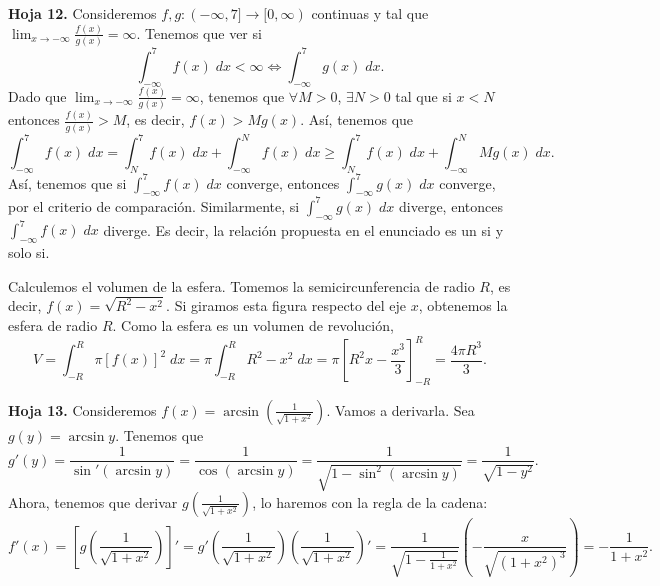 \begin{eg}
	\normalfont \textbf{Hoja 12.} Consideremos $\displaystyle f,g : (-\infty,7] \to [0,\infty) $ continuas y tal que $\displaystyle \lim_{x \to -\infty}\frac{f\left(x\right)}{g\left(x\right)} =\infty  $. Tenemos que ver si 
	\[ \int^{7}_{-\infty} f\left(x\right) \; dx < \infty \iff \int^{7}_{-\infty} g\left(x\right) \; dx .\]
	Dado que $\displaystyle \lim_{x \to -\infty}\frac{f\left(x\right)}{g\left(x\right)} = \infty $, tenemos que $\displaystyle \forall M > 0 $, $\displaystyle \exists N > 0 $ tal que si $\displaystyle x < N $ entonces $\displaystyle \frac{f\left(x\right)}{g\left(x\right)} > M $, es decir, $\displaystyle f\left(x\right) > Mg\left(x\right) $. Así, tenemos que
	\[\int^{7}_{-\infty} f\left(x\right) \; dx = \int^{7}_{N} f\left(x\right) \; dx + \int^{N}_{-\infty} f\left(x\right) \; dx \geq \int^{7}_{N} f\left(x\right) \; dx + \int^{N}_{-\infty} Mg\left(x\right) \; dx .\]
	Así, tenemos que si $\displaystyle \int^{7}_{-\infty} f\left(x\right) \; dx $ converge, entonces $\displaystyle \int^{7}_{-\infty} g\left(x\right) \; dx $ converge, por el criterio de comparación. Similarmente, si $\displaystyle \int^{7}_{-\infty} g\left(x\right) \; dx $ diverge, entonces $\displaystyle \int^{7}_{-\infty} f\left(x\right) \; dx $ diverge. Es decir, la relación propuesta en el enunciado es un si y solo si.
\end{eg}
\begin{eg}
\normalfont Calculemos el volumen de la esfera. Tomemos la semicircunferencia de radio $\displaystyle R $, es decir, $\displaystyle f\left(x\right) = \sqrt{R^{2}-x^{2}} $. Si giramos esta figura respecto del eje $\displaystyle x $, obtenemos la esfera de radio $\displaystyle R $. Como la esfera es un volumen de revolución,
\[V = \int^{R}_{-R} \pi [f\left(x\right)]^{2} \; dx =\pi \int^{R}_{-R} R^{2}-x^{2} \; dx = \pi \left[R^{2}x - \frac{x^{3}}{3}\right] ^{R}_{-R} = \frac{4\pi R^{3}}{3} .\]
\end{eg}
\begin{eg}
\normalfont \textbf{Hoja 13.} Consideremos $\displaystyle f\left(x\right) = \arcsin\left(\frac{1}{\sqrt{1 + x^{2}}}\right) $. Vamos a derivarla. Sea $\displaystyle g\left(y\right) = \arcsin y $. Tenemos que 
\[g'\left(y\right) = \frac{1}{\sin'\left(\arcsin y\right)} = \frac{1}{\cos\left(\arcsin y\right)} = \frac{1}{\sqrt{1 - \sin ^{2}\left(\arcsin y\right)}} = \frac{1}{\sqrt{1-y^{2}}} .\]
Ahora, tenemos que derivar $\displaystyle g\left(\frac{1}{\sqrt{1 + x^{2}}}\right) $, lo haremos con la regla de la cadena:
	\[ f'\left(x\right) = \left[g\left(\frac{1}{\sqrt{1 + x^{2}}}\right)\right] ' = g'\left(\frac{1}{\sqrt{1 + x^{2}}}\right)\left(\frac{1}{\sqrt{1 + x^{2}}}\right)' = \frac{1}{\sqrt{1 - \frac{1}{1+x^{2}}}}\left(-\frac{x}{\sqrt{\left(1+x^{2}\right)^{3}}}\right) = -\frac{1}{1+x^{2}}.\]
\end{eg}

